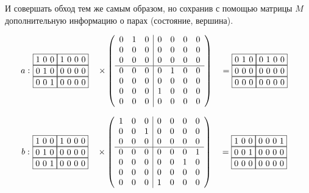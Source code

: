 \begin{example}
И совершать обход тем же самым образом, но сохранив с помощью матрицы $M$ дополнительную информацию о парах (состояние, вершина).

\begin{alignat*}{7}
  a:\,\,
  & \begin{matrix}
    \fbox{1 0 0} \fbox{1 0 0 0} \\ 
    \fbox{0 1 0} \fbox{0 0 0 0} \\
    \fbox{0 0 1} \fbox{0 0 0 0}
      \end{matrix}  &&
      \times
      \left(\begin{array}{c c c | c c c c}
      0 & 1 & 0 & 0 & 0 & 0 & 0 \\
      0 & 0 & 0 & 0 & 0 & 0 & 0 \\
      0 & 0 & 0 & 0 & 0 & 0 & 0 \\
      \hline
      0 & 0 & 0 & 0 & 1 & 0 & 0 \\
      0 & 0 & 0 & 0 & 0 & 0 & 0 \\
      0 & 0 & 0 & 1 & 0 & 0 & 0 \\
      0 & 0 & 0 & 0 & 0 & 0 & 0 
      \end{array}\right)
      &&= \begin{matrix}
        \fbox{0 1 0} \fbox{0 1 0 0} \\ 
        \fbox{0 0 0} \fbox{0 0 0 0} \\
        \fbox{0 0 0} \fbox{0 0 0 0}
    \end{matrix}
\end{alignat*}
  
\begin{alignat*}{7}
  b:\,\,
  & \begin{matrix}
    \fbox{1 0 0} \fbox{1 0 0 0} \\ 
    \fbox{0 1 0} \fbox{0 0 0 0} \\
    \fbox{0 0 1} \fbox{0 0 0 0}
      \end{matrix}  &&
      \times
      \left(\begin{array}{c c c | c c c c}
      1 & 0 & 0 & 0 & 0 & 0 & 0 \\
      0 & 0 & 1 & 0 & 0 & 0 & 0 \\
      0 & 0 & 0 & 0 & 0 & 0 & 0 \\
      \hline
      0 & 0 & 0 & 0 & 0 & 0 & 1 \\
      0 & 0 & 0 & 0 & 0 & 1 & 0 \\
      0 & 0 & 0 & 0 & 0 & 0 & 0 \\
      0 & 0 & 0 & 1 & 0 & 0 & 0 
      \end{array}\right)
      &&= \begin{matrix}
        \fbox{1 0 0} \fbox{0 0 0 1} \\ 
        \fbox{0 0 1} \fbox{0 0 0 0} \\
        \fbox{0 0 0} \fbox{0 0 0 0}
    \end{matrix}
\end{alignat*}


\end{example}
